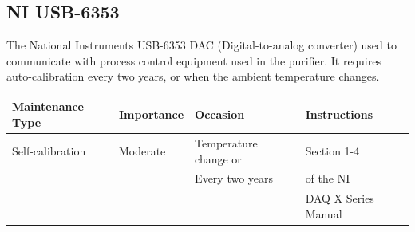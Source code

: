\subsection{NI USB-6353}

The National Instruments USB-6353 DAC (Digital-to-analog converter)
used to communicate with
process control equipment used in the purifier. It requires
auto-calibration every two years, or when the ambient temperature
changes.

\begin{table}[H]
  \centering
  \begin{tabular}{llll}
    \hline
    Maintenance Type & Importance & Occasion & Instructions \\
    \hline
    Self-calibration & Moderate & Temperature change or & Section 1-4  \\
    &&Every two years& of the NI \\
    &&& DAQ X Series Manual \\
    \hline
  \end{tabular}
\end{table}
